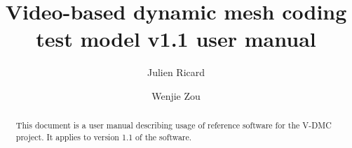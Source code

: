 \documentclass[a4paper,11pt]{mpegdoc}
\title{Video-based dynamic mesh coding test model v1.1 user manual}
\author{%
  Julien Ricard	\email{julien.ricard@interdital.com}  
\and
  Wenjie Zou \email{wjzou@xidian.edu.cn} 
}
\begin{document}
\maketitle
\begin{abstract}
This document is a user manual describing usage of reference software
for the V-DMC project. It applies to version 1.1 of the software.
\end{abstract}
\newpage

\tableofcontents

\newpage







 



%
\end{document}
